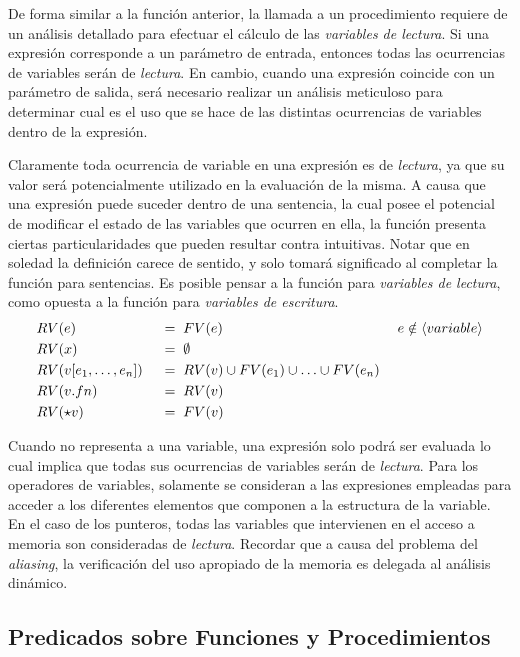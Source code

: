 De forma similar a la función anterior, la llamada a un procedimiento requiere de un análisis detallado para efectuar el cálculo de las \textit{variables de lectura}.
Si una expresión corresponde a un parámetro de entrada, entonces todas las ocurrencias de variables serán de \textit{lectura}.
En cambio, cuando una expresión coincide con un parámetro de salida, será necesario realizar un análisis meticuloso para determinar cual es el uso que se hace de las distintas ocurrencias de variables dentro de la expresión.

Claramente toda ocurrencia de variable en una expresión es de \textit{lectura}, ya que su valor será potencialmente utilizado en la evaluación de la misma.
A causa que una expresión puede suceder dentro de una sentencia, la cual posee el potencial de modificar el estado de las variables que ocurren en ella, la función presenta ciertas particularidades que pueden resultar contra intuitivas.
Notar que en soledad la definición carece de sentido, y solo tomará significado al completar la función para sentencias.
Es posible pensar a la función para \textit{variables de lectura}, como opuesta a la función para \textit{variables de escritura}.
\begin{alignat*}{3}
&RV(e)
&&\;=\;
FV(e)
&&\;e \notin \langle variable \rangle
\\
&RV(x)
&&\;=\;
\emptyset
\\
&RV(v [e_1, \ldots, e_n])
&&\;=\;
RV(v) \cup FV(e_1) \cup \ldots \cup FV(e_n)
\\
&RV(v.fn)
&&\;=\;
RV(v)
\\
&RV(\star v)
&&\;=\;
FV(v)
\end{alignat*}

Cuando no representa a una variable, una expresión solo podrá ser evaluada lo cual implica que todas sus ocurrencias de variables serán de \textit{lectura}.
Para los operadores de variables, solamente se consideran a las expresiones empleadas para acceder a los diferentes elementos que componen a la estructura de la variable.
En el caso de los punteros, todas las variables que intervienen en el acceso a memoria son consideradas de \textit{lectura}.
Recordar que a causa del problema del \textit{aliasing}, la verificación del uso apropiado de la memoria es delegada al análisis dinámico.

\subsection{Predicados sobre Funciones y Procedimientos}

